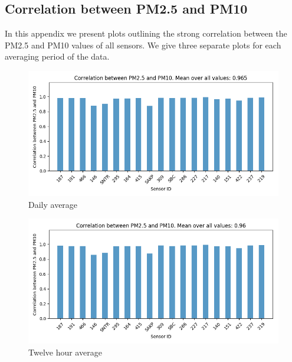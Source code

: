 \documentclass[12pt,a4paper,twoside]{scrartcl}
\numberwithin{equation}{section}
\newcounter{mypagecount}%
\newenvironment{interlude}{%
  \clearpage
  \setcounter{mypagecount}{\value{page}}%
  \thispagestyle{empty}%
  \pagestyle{empty}%
  }{%
  \clearpage
  \setcounter{page}{\value{mypagecount}}%
  }
\let\chapter=\section %
\begin{document}
\begin{interlude}

  \begin{appendices}
    \chapter{Correlation between PM2.5 and PM10}\label{app:a}
    In this appendix we present plots outlining the strong correlation between the PM2.5 and PM10 values of all sensors. We give three separate plots for each averaging period of the data.
    \begin{center}

      \begin{figure}[H]
        \centerline{\includegraphics[width=1\textwidth]{figures/1D_P1_P2_correlation}}
        \caption[PM2.5-PM10 correlation (one day average)]{Daily average}
      \end{figure}

      \begin{figure}[H]
        \centerline{\includegraphics[width=1\textwidth]{figures/12H_P1_P2_correlation}}
        \caption[PM2.5-PM10 correlation (twelve hour average)]{Twelve hour average}
      \end{figure}


\end{center}
\end{appendices}
\end{interlude}
\end{document}
